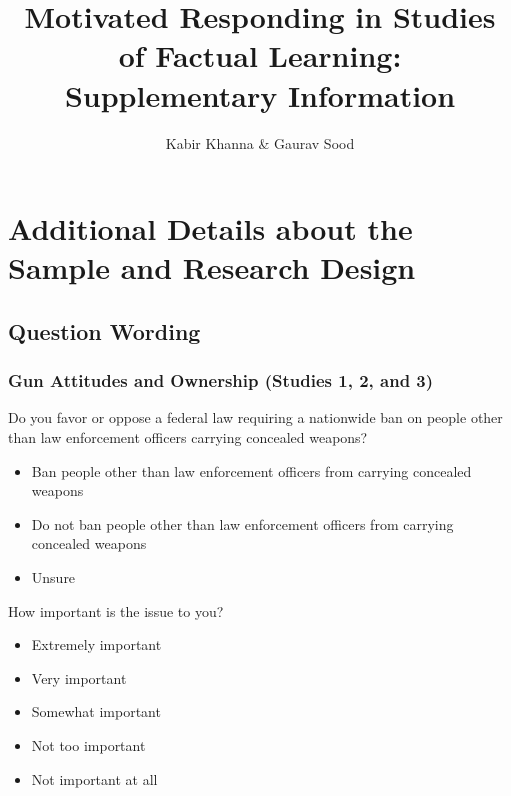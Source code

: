 \documentclass[12pt, letterpaper]{article}
\title{\large{Motivated Responding in Studies of Factual Learning: \\Supplementary Information}}
\author{Kabir Khanna \& Gaurav Sood}
\begin{document}
\maketitle
\thispagestyle{empty}

\newpage
\doublespacing
\setcounter{page}{1}


\section{Additional Details about the Sample and Research Design}

\subsection{Question Wording}
\label{sec:qwording}
\singlespacing
\setlength{\parindent}{0cm} 

\subsubsection{Gun Attitudes and Ownership (Studies 1, 2, and 3)}
Do you favor or oppose a federal law requiring a nationwide ban on people other than law enforcement officers carrying concealed weapons?
\vspace{-3mm}
\begin{itemize}
\setlength\itemsep{-.5em}
  \item Ban people other than law enforcement officers from carrying concealed weapons
  \item Do not ban people other than law enforcement officers from carrying concealed weapons
  \item Unsure
\end{itemize}

How important is the issue to you?
\vspace{-3mm}
\begin{itemize}
\setlength\itemsep{-.5em}
  \item Extremely important
  \item Very important
  \item Somewhat important
  \item Not too important
  \item Not important at all
\end{itemize}
\end{document}
